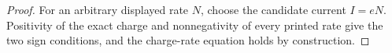 \begin{proof}
  For an arbitrary displayed rate $N$, choose the candidate current $I=eN$.  Positivity of the exact charge and nonnegativity of every printed rate give the two sign conditions, and the charge-rate equation holds by construction.
\end{proof}
